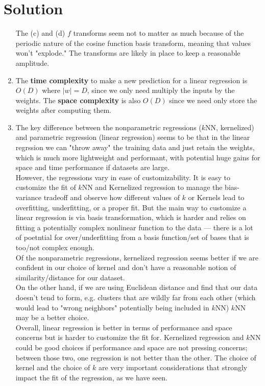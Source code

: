 \documentclass[submit]{harvardml}
\newenvironment{solution}
  {\color{blue}\section*{Solution}}
{}
\begin{document}
\begin{solution}
\begin{enumerate}
    The (c) and (d) $f$ transforms seem not to matter as much because of the periodic nature of the cosine function basis transform, meaning that values won't "explode." The transforms are likely in place to keep a reasonable amplitude. \fi 
    
    \item The \textbf{time complexity} to make a new prediction for a linear regression is $O(D)$ where $|w| = D$, since we only need multiply the inputs by the weights. The \textbf{space complexity} is also $O(D)$ since we need only store the weights after computing them.
    
    \item The key difference between the nonparametric regressions ($k$NN, kernelized) and parametric regression (linear regression) seems to be that in the linear regrssion we can "throw away" the training data and just retain the weights, which is much more lightweight and performant, with potential huge gains for space and time performance if datasets are large.\\
    
    However, the regressions vary in ease of customizability. It is easy to customize the fit of $k$NN and Kernelized regression to manage the bias-variance tradeoff and observe how different values of $k$ or Kernels lead to overfitting, underfitting, or a proper fit. But the main way to customize a linear regression is via basis transformation, which is harder and relies on fitting a potentially complex nonlinear function to the data — there is a lot of poetntial for over/underfitting from a basis function/set of bases that is too/not complex enough.\\

    Of the nonparametric regressions, kernelized regression seems better if we are confident in our choice of kernel and don't have a reasonable notion of similarity/distance for our dataset. \\
    
    On the other hand, if we are using Euclidean distance and find that our data doesn't tend to form, e.g. clusters that are wildly far from each other (which would lead to "wrong neighbors" potentially being included in $k$NN) $k$NN may be a better choice.\\

    Overall, linear regression is better in terms of performance and space concerns but is harder to customize the fit for. Kernelized regression and $k$NN could be good choices if performance and space are not pressing concerns; between those two, one regression is not better than the other. The choice of kernel and the choice of $k$ are very important considerations that strongly impact the fit of the regression, as we have seen. 
    
    \end{enumerate}
\end{solution}
\end{document}
